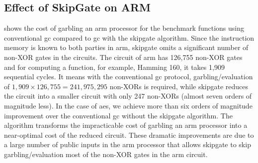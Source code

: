 \subsection{Effect of {SkipGate} on ARM}
 shows the cost of garbling an \gls{arm} processor for the benchmark functions using conventional \acrshort{gc} compared to \acrshort{gc} with the \gls{skipgate} algorithm.
Since the instruction memory is known to both parties in \gls{arm}, \gls{skipgate} omits a significant number of non-XOR gates in the circuits.
The circuit of \gls{arm} has 126,755 non-XOR gates and for computing a function, for example, Hamming 160, it takes 1,909 sequential cycles.
It means with the conventional \acrshort{gc} protocol, garbling/evaluation of $1,909\times126,755=241,975,295$ non-XORs is required, while \gls{skipgate} reduces the circuit into a smaller circuit with only 247 non-XORs (almost seven orders of magnitude less).
In the case of \acrshort{aes}, we achieve more than six orders of magnitude improvement over the conventional \acrshort{gc} without the \gls{skipgate} algorithm.
The algorithm transforms the impracticable cost of garbling an \gls{arm} processor into a near-optimal cost of the reduced circuit.
These dramatic improvements are due to a large number of public inputs in the \gls{arm} processor that allows \gls{skipgate} to skip garbling/evaluation most of the non-XOR gates in the \gls{arm} circuit.

